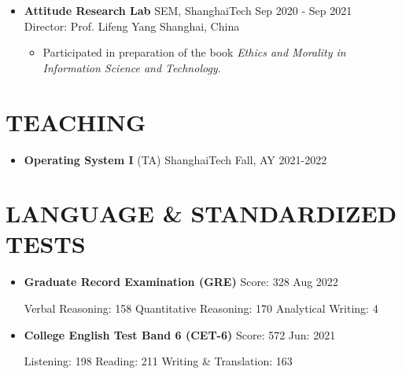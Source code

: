 \documentclass[a4paper,10pt]{ctexart} %
\begin{document}
    \begin{itemize}
        \item \textbf{Attitude Research Lab} \quad SEM, ShanghaiTech \hfill Sep 2020 - Sep 2021 \\
        {\small Director: Prof. Lifeng Yang} \hfill Shanghai, China
        \begin{small}
            \begin{itemize}
                \item Participated in preparation of the book \textit{Ethics and Morality in Information Science and Technology}.
            \end{itemize}
        \end{small}
    \end{itemize}



\section{TEACHING}

    \begin{itemize}
        \item \textbf{Operating System I} (TA) \hfill ShanghaiTech \quad Fall, AY 2021-2022
    \end{itemize}



\section{LANGUAGE \& STANDARDIZED TESTS}

    \begin{itemize}
        \item \textbf{Graduate Record Examination (GRE)} \quad Score: 328 \hfill Aug 2022 \\
        \begin{small}
            Verbal Reasoning: 158 \quad Quantitative Reasoning: 170 \quad Analytical Writing: 4
        \end{small}
        \item \textbf{College English Test Band 6 (CET-6)} \quad Score: 572 \hfill Jun: 2021 \\
        \begin{small}
            Listening: 198 \quad Reading: 211 \quad Writing \& Translation: 163
        \end{small}
    \end{itemize}
\end{document}

